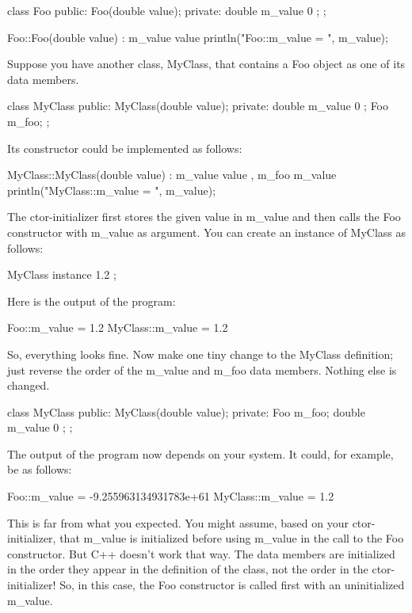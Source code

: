 \begin{cpp}
class Foo
{
    public:
        Foo(double value);
    private:
        double m_value { 0 };
};

Foo::Foo(double value) : m_value { value }
{
    println("Foo::m_value = {}", m_value);
}
\end{cpp}

Suppose you have another class, MyClass, that contains a Foo object as one of its data members.

\begin{cpp}
class MyClass
{
    public:
        MyClass(double value);
    private:
        double m_value { 0 };
        Foo m_foo;
};
\end{cpp}

Its constructor could be implemented as follows:

\begin{cpp}
MyClass::MyClass(double value) : m_value { value }, m_foo { m_value }
{
    println("MyClass::m_value = {}", m_value);
}
\end{cpp}

The ctor-initializer first stores the given value in m\_value and then calls the Foo constructor with m\_value as argument. You can create an instance of MyClass as follows:

\begin{cpp}
MyClass instance { 1.2 };
\end{cpp}

Here is the output of the program:

\begin{cpp}
Foo::m_value = 1.2
MyClass::m_value = 1.2
\end{cpp}

So, everything looks fine. Now make one tiny change to the MyClass definition; just reverse the order of the m\_value and m\_foo data members. Nothing else is changed.

\begin{cpp}
class MyClass
{
    public:
        MyClass(double value);
    private:
        Foo m_foo;
        double m_value { 0 };
};
\end{cpp}

The output of the program now depends on your system. It could, for example, be as follows:

\begin{shell}
Foo::m_value = -9.255963134931783e+61
MyClass::m_value = 1.2
\end{shell}

This is far from what you expected. You might assume, based on your ctor-initializer, that m\_value is initialized before using m\_value in the call to the Foo constructor. But C++ doesn’t work that way. The data members are initialized in the order they appear in the definition of the class, not the order in the ctor-initializer! So, in this case, the Foo constructor is called first with an uninitialized m\_value.


